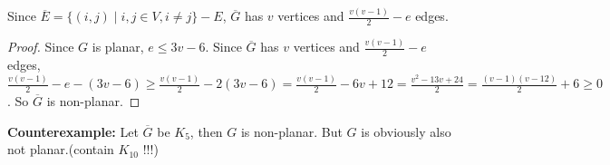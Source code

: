 \documentclass[11pt]{article}
\begin{document}
\begin{solution}
\begin{Parts}
    \Part
        Since $\overline{E} = \{(i,j) \mid i,j \in V, i \neq j\} - E$, $\overline{G}$ has $v$ vertices and $\frac{v(v-1)}{2} - e$ edges.
    \Part
    \begin{proof}
        Since $G$ is planar, $e \le 3v-6$. Since $\overline{G}$ has $v$ vertices and $\frac{v(v-1)}{2} - e$ edges, $\frac{v(v-1)}{2} - e - (3v-6) \ge \frac{v(v-1)}{2} -2(3v-6) = \frac{v(v-1)}{2} -6v + 12 = \frac{v^2-13v+24}{2} = \frac{(v-1)(v-12)}{2} + 6 \ge 0$. So $\overline{G}$ is non-planar.
    \end{proof}
    \Part
    \textbf{Counterexample:}
    Let $\overline{G}$ be $K_5$, then $G$ is non-planar. But $G$ is obviously also not planar.(contain $K_{10}$ !!!)
\end{Parts}
\end{solution}
\end{document}
